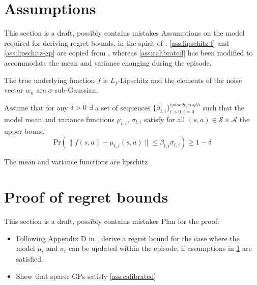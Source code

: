 
\section{Assumptions}\label{sec:assumptions}
This section is a draft, possibly contains mistakes
Assumptions on the model required for deriving regret bounds, in the spirit of \cite{curiCombining2021}. \cref{ass:lipschitz-f} and \cref{ass:lipschitz-gp} are copied from \cite{curiCombining2021}, whereas \cref{ass:calibrated} has been modified to accommodate the mean and variance changing during the episode.
\begin{assumption}\label{ass:lipschitz-f}
The true underlying function $f$ is $L_f$-Lipschitz and the elements of the noise vector $w_n$ are $\sigma$-sub-Gaussian.
\end{assumption}
\begin{assumption}\label{ass:calibrated}
Assume that for any $\delta >0$ $\exists$ a set of sequences $\{\beta_{t, i}\}_{t>0, i=0}^{episode_length}$ such that the model mean and variance functions $\mu_{t, i}$, $\sigma_{t, i}$ satisfy for all $(s, a) \in \mathcal{S} \times \mathcal{A}$ the upper bound
\begin{equation}\label{eq:calibrated}
\text{Pr}(\| f(s, a) - \mu_{t, i}(s, a) \| \leq \beta_{t, i}\sigma_{t, i}) \geq 1 - \delta
\end{equation}
\end{assumption}

\begin{assumption}\label{ass:lipschitz-gp}
The mean and variance functions are lipschitz
\end{assumption}
\section{Proof of regret bounds}
This section is a draft, possibly contains mistakes
Plan for the proof:
\begin{itemize}
\item Following Appendix D in \cite{curiCombining2021}, derive a regret bound for the case where the model $\mu_t$ and $\sigma_t$ can be updated within the episode, if assumptions in \cref{sec:assumptions} are satisfied.
\item Show that sparse GPs satisfy \cref{ass:calibrated}
\end{itemize}
